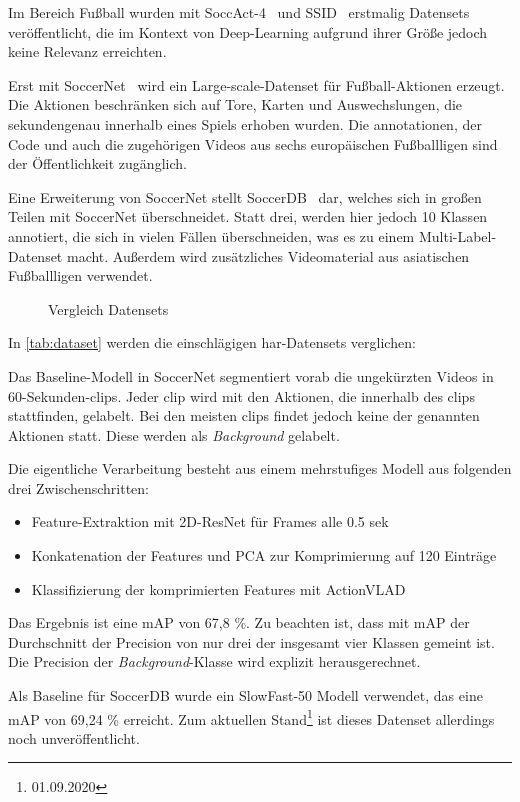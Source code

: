 Im Bereich Fußball wurden mit SoccAct-4~\cite{Ballan09} und SSID~\cite{Jiang16} erstmalig Datensets veröffentlicht, die im Kontext von Deep-Learning aufgrund ihrer Größe jedoch keine Relevanz erreichten.

Erst mit SoccerNet~\cite{Giancola18} wird ein Large-scale-Datenset für Fußball-Aktionen erzeugt.
Die Aktionen beschränken sich auf Tore, Karten und Auswechslungen, die sekundengenau innerhalb eines Spiels erhoben wurden.
Die \gls{annotationen}, der Code und auch die zugehörigen Videos aus sechs europäischen Fußballligen sind der Öffentlichkeit zugänglich.

Eine Erweiterung von SoccerNet stellt SoccerDB~\cite{Jiang19} dar, welches sich in großen Teilen mit SoccerNet überschneidet.
Statt drei, werden hier jedoch 10 Klassen annotiert, die sich in vielen Fällen überschneiden, was es zu einem Multi-Label-Datenset macht.
Außerdem wird zusätzliches Videomaterial aus asiatischen Fußballligen verwendet.

\begin{figure}
    \centering
    \caption[Vergleich Datensets]{Vergleich Datensets}
    \label{tab:dataset}
\end{figure}

In \autoref{tab:dataset} werden die einschlägigen \gls{har}-Datensets verglichen:

Das Baseline-Modell in SoccerNet segmentiert vorab die ungekürzten Videos in 60-Sekunden-\glspl{clip}.
Jeder \gls{clip} wird mit den Aktionen, die innerhalb des \glspl{clip} stattfinden, gelabelt.
Bei den meisten \glspl{clip} findet jedoch keine der genannten Aktionen statt.
Diese werden als \emph{Background} gelabelt.

Die eigentliche Verarbeitung besteht aus einem mehrstufiges Modell aus folgenden drei Zwischenschritten:

\begin{itemize}
    \item Feature-Extraktion mit 2D-ResNet für Frames alle 0.5 sek
    \item Konkatenation der Features und PCA zur Komprimierung auf 120 Einträge
    \item Klassifizierung der komprimierten Features mit ActionVLAD
\end{itemize}

Das Ergebnis ist eine mAP von 67,8 \%.
Zu beachten ist, dass mit mAP der Durchschnitt der Precision von nur drei der insgesamt vier Klassen gemeint ist.
Die Precision der \emph{Background}-Klasse wird explizit herausgerechnet.

Als Baseline für SoccerDB wurde ein SlowFast-50 Modell verwendet, das eine mAP von 69,24 \% erreicht.
Zum aktuellen Stand\footnote{01.09.2020} ist dieses Datenset allerdings noch unveröffentlicht.
